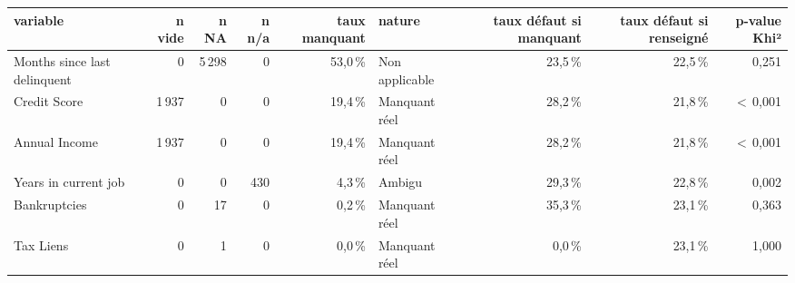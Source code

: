 \begin{tabular}{lrrrrlrrr}
\toprule
\textbf{variable} & \textbf{n vide} & \textbf{n NA} & \textbf{n n/a} & \textbf{taux manquant} & \textbf{nature} & \textbf{taux défaut si manquant} & \textbf{taux défaut si renseigné} & \textbf{p-value Khi²} \\
\midrule
Months since last delinquent & 0 & 5\,298 & 0 & 53,0\,\% & Non applicable & 23,5\,\% & 22,5\,\% & 0,251 \\
Credit Score & 1\,937 & 0 & 0 & 19,4\,\% & Manquant réel & 28,2\,\% & 21,8\,\% & $<$\,0,001 \\
Annual Income & 1\,937 & 0 & 0 & 19,4\,\% & Manquant réel & 28,2\,\% & 21,8\,\% & $<$\,0,001 \\
Years in current job & 0 & 0 & 430 & 4,3\,\% & Ambigu & 29,3\,\% & 22,8\,\% & 0,002 \\
Bankruptcies & 0 & 17 & 0 & 0,2\,\% & Manquant réel & 35,3\,\% & 23,1\,\% & 0,363 \\
Tax Liens & 0 & 1 & 0 & 0,0\,\% & Manquant réel & 0,0\,\% & 23,1\,\% & 1,000 \\
\bottomrule
\end{tabular}
